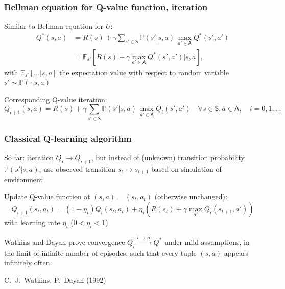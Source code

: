 \documentclass[t]{beamer}
\begin{document}
\begin{frame}
\frametitle{Bellman equation for Q-value function, iteration}
Similar to Bellman equation for $U$:
\[
\begin{split}
Q^*(s, a)
&= R(s) + \gamma \sum_{s' \in \mathsf{S}} \mathbb{P}(s' \vert s, a) \, \max_{a' \in \mathsf{A}} Q^*(s', a') \\
&= \mathbb{E}_{s'}\!\left[ R(s) + \gamma \max_{a' \in \mathsf{A}} Q^*(s', a') \Big\vert s, a \right],
\end{split}
\]
with $\mathbb{E}_{s'}[\dots \vert s, a]$ the expectation value with respect to random variable $s' \sim \mathbb{P}(\cdot \vert s, a)$

Corresponding Q-value iteration: 
\[
Q_{i+1}(s, a) = R(s) + \gamma \sum_{s' \in \mathsf{S}} \mathbb{P}(s' \vert s,a) \, \max_{a' \in \mathsf{A}} Q_i(s', a') \quad \forall s \in \mathsf{S}, a \in \mathsf{A}, \quad i = 0, 1, \dots
\]
\end{frame}



\begin{frame}
\frametitle{Classical Q-learning algorithm}
So far: iteration $Q_i \to Q_{i+1}$, but instead of (unknown) transition probability $\mathbb{P}(s' \vert s, a)$, use observed transition $s_t \to s_{t+1}$ based on simulation of environment

Update Q-value function at $(s,a) = (s_t, a_t)$ (otherwise unchanged):
\[
Q_{i+1}(s_t, a_t) = (1 - \eta_i) Q_i(s_t, a_t) + \eta_i \left( R(s_t) + \gamma \max_{a'} Q_i(s_{t+1}, a') \right)
\]
with learning rate $\eta_i$ ($0 < \eta_i < 1$)

Watkins and Dayan prove convergence $Q_i \xrightarrow{i \to \infty} Q^*$ under mild assumptions, in the limit of infinite number of episodes, such that every tuple $(s, a)$ appears infinitely often.

{\small
C.~J.~Watkins, P.~Dayan (1992) \nocite{WatkinsDayan1992}
}
\end{frame}
\end{document}
